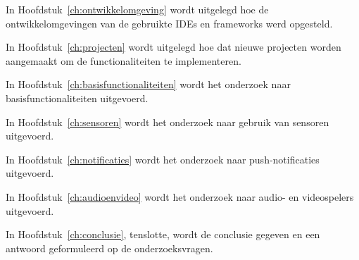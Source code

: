 In Hoofdstuk~\ref{ch:ontwikkelomgeving} wordt uitgelegd hoe de ontwikkelomgevingen van de gebruikte IDEs en frameworks werd opgesteld.

In Hoofdstuk~\ref{ch:projecten} wordt uitgelegd hoe dat nieuwe projecten worden aangemaakt om de functionaliteiten te implementeren.

In Hoofdstuk~\ref{ch:basisfunctionaliteiten} wordt het onderzoek naar basisfunctionaliteiten uitgevoerd.

In Hoofdstuk~\ref{ch:sensoren} wordt het onderzoek naar gebruik van sensoren uitgevoerd.

In Hoofdstuk~\ref{ch:notificaties} wordt het onderzoek naar push-notificaties uitgevoerd.

In Hoofdstuk~\ref{ch:audioenvideo} wordt het onderzoek naar audio- en videospelers uitgevoerd.

In Hoofdstuk~\ref{ch:conclusie}, tenslotte, wordt de conclusie gegeven en een antwoord geformuleerd op de onderzoeksvragen.













